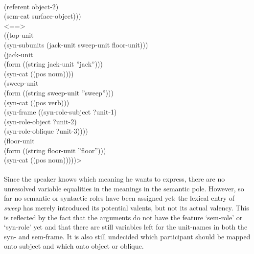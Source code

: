 {{\\ \hspace*{5mm} (referent object-2)
\\ \hspace*{5mm} (sem-cat surface-object)))
\\ <==>
\\ ((top-unit
\\ \hspace*{5mm} (syn-subunits (jack-unit sweep-unit floor-unit)))
\\ \hspace*{2mm}(jack-unit
\\ \hspace*{5mm} (form ((string jack-unit ''jack'')))
\\ \hspace*{5mm} (syn-cat ((pos noun))))
\\ \hspace*{2mm}(sweep-unit
\\ \hspace*{5mm} (form ((string sweep-unit ''sweep'')))
\\ \hspace*{5mm} (syn-cat ((pos verb)))
\\ \hspace*{5mm} (syn-frame ((syn-role-subject ?unit-1)
\\ \hspace*{30mm}(syn-role-object ?unit-2)
\\ \hspace*{30mm}(syn-role-oblique ?unit-3))))
\\ \hspace*{2mm}(floor-unit
\\ \hspace*{5mm} (form ((string floor-unit ''floor'')))
\\ \hspace*{5mm} (syn-cat ((pos noun)))))>}}
\\
\\
Since the speaker knows which meaning he wants to express, there are no unresolved variable equalities in the meanings in the semantic pole. However, so far no semantic or syntactic roles have been assigned yet: the lexical entry of {\em sweep} has merely introduced its potential valents, but not its actual valency. This is reflected by the fact that the arguments do not have the feature `sem-role' or `syn-role' yet and that there are still variables left for the unit-names in both the syn- and sem-frame. It is also still undecided which participant should be mapped onto subject and which onto object or oblique.

